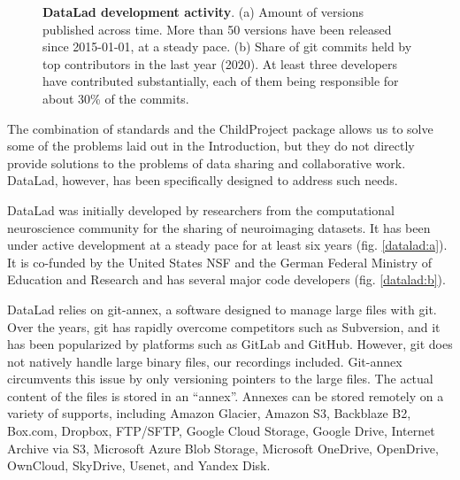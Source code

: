 \documentclass[smallextended]{svjour3}       %
\begin{document}
\begin{figure}[htb]
\centering
\begin{minipage}{.5\linewidth}
\centering
\subfloat[]{\label{datalad:a}\resizebox{!}{0.70\linewidth}{\large\normalsize}}
\end{minipage}%
\begin{minipage}{.5\linewidth}
\centering
\subfloat[]{\label{datalad:b}\resizebox{!}{0.70\linewidth}{\large\normalsize}}
\end{minipage}\par\medskip


\caption{\label{fig:datalad}\textbf{DataLad development activity}. (a) Amount of versions published across time. More than 50 versions have been released since 2015-01-01, at a steady pace. (b) Share of git commits held by top contributors in the last year (2020). At least three developers have contributed substantially, each of them being responsible for about 30\% of the commits.}

\end{figure}

The combination of standards and the ChildProject package allows us to solve some of the problems laid out in the Introduction, but they do not directly provide solutions to the problems of data sharing and collaborative work. DataLad, however, has been specifically designed to address such needs.

DataLad \citep{datalad_handbook} was initially developed by researchers from the computational neuroscience community for the sharing of neuroimaging datasets. It has been under active development at a steady pace for at least six years (fig. \ref{datalad:a}). It is co-funded by the United States NSF and the German Federal Ministry of Education and Research and has several major code developers (fig. \ref{datalad:b}).%

DataLad relies on git-annex, a software designed to manage large files with git. Over the years, git has rapidly overcome competitors such as Subversion, and it has been popularized by platforms such as GitLab and GitHub. However, git does not natively handle large binary files, our recordings included. Git-annex circumvents this issue by only versioning pointers to the large files. The actual content of the files is stored in an ``annex''. Annexes can be stored remotely on a variety of supports, including Amazon Glacier, Amazon S3, Backblaze B2, Box.com, Dropbox, FTP/SFTP, Google Cloud Storage, Google Drive, Internet Archive via S3, Microsoft Azure Blob Storage, Microsoft OneDrive, OpenDrive, OwnCloud, SkyDrive, Usenet, and Yandex Disk.
\end{document}
